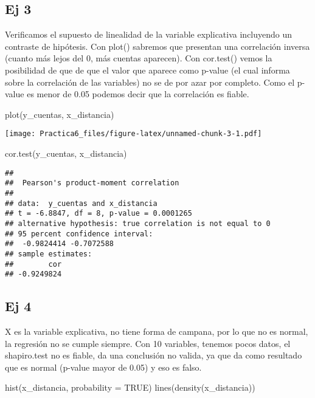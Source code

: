 \documentclass[
]{article}
\newenvironment{Shaded}{\begin{snugshade}}{\end{snugshade}}
\newcommand{\AttributeTok}[1]{\textcolor[rgb]{0.77,0.63,0.00}{#1}}
\newcommand{\ConstantTok}[1]{\textcolor[rgb]{0.00,0.00,0.00}{#1}}
\newcommand{\FunctionTok}[1]{\textcolor[rgb]{0.00,0.00,0.00}{#1}}
\newcommand{\NormalTok}[1]{#1}
\begin{document}
\hypertarget{ej-3}{%
\subsection{Ej 3}\label{ej-3}}

Verificamos el supuesto de linealidad de la variable explicativa
incluyendo un contraste de hipótesis. Con plot() sabremos que presentan
una correlación inversa (cuanto más lejos del 0, más cuentas aparecen).
Con cor.test() vemos la posibilidad de que de que el valor que aparece
como p-value (el cual informa sobre la correlación de las variables) no
se de por azar por completo. Como el p-value es menor de 0.05 podemos
decir que la correlación es fiable.

\begin{Shaded}
\begin{Highlighting}[]
\FunctionTok{plot}\NormalTok{(y\_cuentas, x\_distancia)}
\end{Highlighting}
\end{Shaded}

\texttt{[image: Practica6\_files/figure-latex/unnamed-chunk-3-1.pdf]}

\begin{Shaded}
\begin{Highlighting}[]
\FunctionTok{cor.test}\NormalTok{(y\_cuentas, x\_distancia)}
\end{Highlighting}
\end{Shaded}

\begin{verbatim}
## 
##  Pearson's product-moment correlation
## 
## data:  y_cuentas and x_distancia
## t = -6.8847, df = 8, p-value = 0.0001265
## alternative hypothesis: true correlation is not equal to 0
## 95 percent confidence interval:
##  -0.9824414 -0.7072588
## sample estimates:
##        cor 
## -0.9249824
\end{verbatim}

\hypertarget{ej-4}{%
\subsection{Ej 4}\label{ej-4}}

X es la variable explicativa, no tiene forma de campana, por lo que no
es normal, la regresión no se cumple siempre. Con 10 variables, tenemos
pocos datos, el shapiro.test no es fiable, da una conclusión no valida,
ya que da como resultado que es normal (p-value mayor de 0.05) y eso es
falso.

\begin{Shaded}
\begin{Highlighting}[]
\FunctionTok{hist}\NormalTok{(x\_distancia, }\AttributeTok{probability =} \ConstantTok{TRUE}\NormalTok{)}
\FunctionTok{lines}\NormalTok{(}\FunctionTok{density}\NormalTok{(x\_distancia))}
\end{Highlighting}
\end{Shaded}
\end{document}
